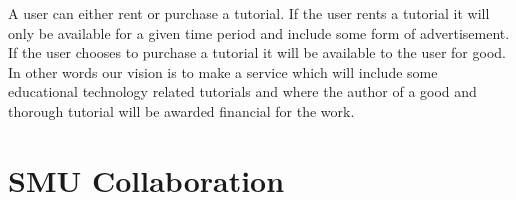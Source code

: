 A user can either rent or purchase a tutorial. If the user rents a tutorial it will only be available for a given time period and include some form of advertisement. If the user chooses to purchase a tutorial it will be available to the user for good. \\ 
In other words our vision is to make a service which will include some educational technology related tutorials and  where the author of a good and thorough tutorial will be awarded financial for the work.

\section{SMU Collaboration}

